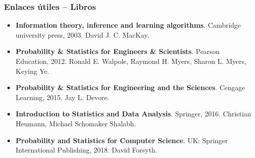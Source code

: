 \documentclass[table]{beamer}
\begin{document}
\begin{frame}
    \frametitle{Enlaces útiles -- Libros}
    \begin{block}{}%
        \begin{itemize}
            \item \textbf{Information theory, inference and learning algorithms}. Cambridge university press, 2003. David J. C. MacKay.%
            \item \textbf{Probability \& Statistics for Engineers \& Scientists}. Pearson Education, 2012. Ronald E. Walpole, Raymond H. Myers, Sharon L. Myers, Keying Ye.
            \item \textbf{Probability \& Statistics for Engineering and the Sciences}. Cengage Learning, 2015. Jay L. Devore.
            \item \textbf{Introduction to Statistics and Data Analysis}. Springer, 2016. Christian Heumann, Michael Schomaker Shalabh.%
            \item \textbf{Probability and Statistics for Computer Science}. UK: Springer International Publishing, 2018. David Forsyth.
          
        \end{itemize}
    \end{block}
\end{frame}
\end{document}
